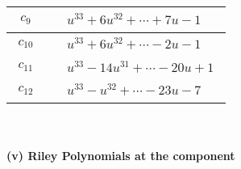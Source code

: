\documentclass[1p]{elsarticle_modified}
\theoremstyle{definition}
\begin{document}
\begin{tabular}{m{50pt}|m{274pt}}
\hline $$\begin{aligned}c_{9}\end{aligned}$$&$\begin{aligned}
&u^{33}+6 u^{32}+\cdots+7 u-1
\end{aligned}$\\
\hline $$\begin{aligned}c_{10}\end{aligned}$$&$\begin{aligned}
&u^{33}+6 u^{32}+\cdots-2 u-1
\end{aligned}$\\
\hline $$\begin{aligned}c_{11}\end{aligned}$$&$\begin{aligned}
&u^{33}-14 u^{31}+\cdots-20 u+1
\end{aligned}$\\
\hline $$\begin{aligned}c_{12}\end{aligned}$$&$\begin{aligned}
&u^{33}- u^{32}+\cdots-23 u-7
\end{aligned}$\\
\hline
\end{tabular}\\~\\
\newpage\renewcommand{\arraystretch}{1}
\flushleft \textbf{(v) Riley Polynomials at the component}\newline \\
\end{document}

